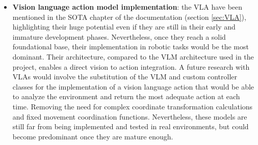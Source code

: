 \begin{itemize}
	\item \textbf{Vision language action model implementation}: the VLA have been mentioned in the SOTA chapter of the documentation (section \ref{sec:VLA}), highlighting their huge potential even if they are still in their early and immature development phases. Nevertheless, once they reach a solid foundational base, their implementation in robotic tasks would be the most dominant. Their architecture, compared to the VLM architecture used in the project, enables a direct vision to action integration. A future research with VLAs would involve the substitution of the VLM and custom controller classes for the implementation of a vision language action that would be able to analyze the environment and return the most adequate action at each time. Removing the need for complex coordinate transformation calculations and fixed movement coordination functions. Nevertheless, these models are still far from being implemented and tested in real environments, but could become predominant once they are mature enough. 
\end{itemize}